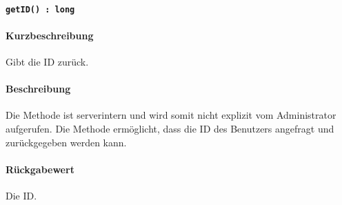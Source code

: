 \paragraph{\texttt{getID() : long}}%
\paragraph*{Kurzbeschreibung}
Gibt die ID zurück.
\paragraph*{Beschreibung}
Die Methode ist serverintern und wird somit nicht explizit vom Administrator aufgerufen.
Die Methode ermöglicht, dass die ID des Benutzers angefragt und zurückgegeben werden kann.
\paragraph*{Rückgabewert}
Die ID.
